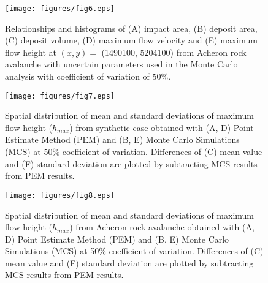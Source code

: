 \documentclass[utf8]{FrontiersinHarvard}
\begin{document}
\begin{figure}
    \centering
    \texttt{[image: figures/fig6.eps]}
    \caption{Relationships and histograms of (A) impact area, (B) deposit area, (C) deposit volume, (D) maximum flow velocity and (E) maximum flow height at $\left (x,y \right) =$ (1490100, 5204100) from Acheron rock avalanche with uncertain parameters used in the Monte Carlo analysis with coefficient of variation of 50\%.}
    \label{fig:acheron_mcs3}
\end{figure}

\begin{figure}
    \centering
    \texttt{[image: figures/fig7.eps]}
    \caption{Spatial distribution of mean and standard deviations of maximum flow height ($h_{max}$) from synthetic case obtained with (A, D) Point Estimate Method (PEM) and (B, E) Monte Carlo Simulations (MCS) at 50\% coefficient of variation. Differences of (C) mean value and (F) standard deviation are plotted by subtracting MCS results from PEM results.}
    \label{fig:simple_vector}
\end{figure}
\begin{figure}
    \centering
    \texttt{[image: figures/fig8.eps]}
    \caption{Spatial distribution of mean and standard deviations of maximum flow height ($h_{max}$) from Acheron rock avalanche obtained with (A, D) Point Estimate Method (PEM) and (B, E) Monte Carlo Simulations (MCS) at 50\% coefficient of variation. Differences of (C) mean value and (F) standard deviation are plotted by subtracting MCS results from PEM results.}
    \label{fig:acheron_vector}
\end{figure}

\clearpage
\end{document}
